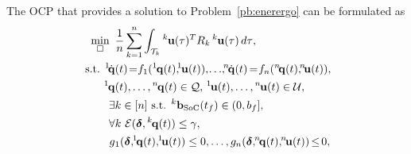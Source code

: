 \documentclass[lettersize,journal,twoside]{IEEEtran}
\theoremstyle{definition}
\begin{document}
The OCP that provides a solution to Problem~\ref{pb:enerergo} can be formulated as
\begin{subequations}\label{eq:ocpfinal}\begin{align}
  \min_{\square}\,\,\,&{\frac{1}{n}\sum_{k=1}^{n}\int_{\mathcal{T}_k}{}^k\hspace*{-.1ex}\mathbf{u}(\tau)^TR_k\,{}^k\hspace*{-.1ex}\mathbf{u}(\tau)\,d\tau},\label{eq:ocpfinalcost}\\
  \text{ s.t. }{}^1\hspace*{-.4ex}\dot{\mathbf{q}}&(t)\hspace*{-.4ex}=\hspace*{-.6ex}f_1({}^1\hspace*{-.2ex}\mathbf{q}(t),\hspace*{-.8ex}{}^1\hspace*{-.2ex}\mathbf{u}(t)),\hspace*{-.3ex}{\small\dots},\hspace*{-.7ex}{}^n\hspace*{-.3ex}\dot{\mathbf{q}}(t)\hspace*{-.3ex}=\hspace*{-.5ex}f_n({}^n\hspace*{-.4ex}\mathbf{q}(t),\hspace*{-.7ex}{}^n\hspace*{-.4ex}\mathbf{u}(t)),\\
  {}^1\hspace*{-.2ex}\mathbf{q}&(t),\dots,{}^n\hspace*{-.2ex}\mathbf{q}(t)\in\mathcal{Q},\,{}^1\hspace*{-.2ex}\mathbf{u}(t),\dots,{}^n\hspace*{-.2ex}\mathbf{u}(t)\in\mathcal{U},\\
  \exists &k\in[n]\text{ s.t. }{}^k\mathbf{b}_{\text{SoC}}(t_f)\in(0,b_f],\label{eq:battconst}\\
  \forall &k\,\,\mathcal{E}(\boldsymbol{\delta},{}^k\hspace*{-.2ex}\mathbf{q}(t))\leq\gamma,\label{eq:ergoconst}\\
  g&{}_1(\boldsymbol{\delta},\hspace*{-.6ex}{}^1\hspace*{-.3ex}\mathbf{q}(t),\hspace*{-.6ex}{}^1\hspace*{-.3ex}\mathbf{u}(t))\leq 0,\dots,g_n(\boldsymbol{\delta},\hspace*{-.6ex}{}^n\hspace*{-.3ex}\mathbf{q}(t),\hspace*{-.6ex}{}^n\hspace*{-.3ex}\mathbf{u}(t))\hspace*{-.3ex}\leq\hspace*{-.3ex}0,\label{eq:ocpfinalextra1}\\

\end{align}
\end{subequations}
\end{document}
